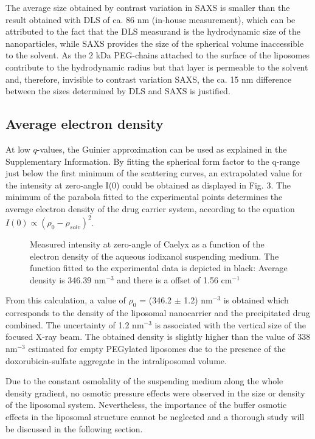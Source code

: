 The average size obtained by contrast variation in SAXS is smaller than the result obtained with DLS of ca. 86 nm (in-house measurement), which can be attributed to the fact that the DLS measurand is the hydrodynamic size of the nanoparticles, while SAXS provides the size of the spherical volume inaccessible to the solvent. As the 2 kDa PEG-chains attached to the surface of the liposomes contribute to the hydrodynamic radius but that layer is permeable to the solvent and, therefore, invisible to contrast variation SAXS, the ca. 15 nm difference between the sizes determined by DLS and SAXS is justified. 

\subsection{Average electron density}
At low $q$-values, the Guinier approximation can be used as explained in the Supplementary Information. By fitting the spherical form factor to the q-range just below the first minimum of the scattering curves, an extrapolated value for the intensity at zero-angle I(0) could be obtained as displayed in Fig. 3. The minimum of the parabola fitted to the experimental points determines the average electron density of the drug carrier system, according to the equation $I(0) \propto (\rho_0-\rho_{solv})^2$.

\begin{figure}
	\centering
		
		\caption{Measured intensity at zero-angle of Caelyx as a function of the electron density of the aqueous iodixanol suspending medium. The function fitted to the experimental data is depicted in black: Average density is 346.39 nm$^{-3}$ and there is a offset of 1.56 cm$^{-1}$}
		\label{fig:CaelyxAverageDensity}
\end{figure}

From this calculation, a value of $\rho_0$ = (346.2 $\pm$ 1.2) nm$^{-3}$ is obtained which corresponds to the density of the liposomal nanocarrier and the precipitated drug combined. The uncertainty of 1.2 nm$^{-3}$ is associated with the vertical size of the focused X-ray beam. The obtained density is slightly higher than the value of 338 nm$^{-3}$ estimated for empty PEGylated liposomes due to the presence of the doxorubicin-sulfate aggregate in the intraliposomal volume. 

Due to the constant osmolality of the suspending medium along the whole density gradient, no osmotic pressure effects were observed in the size or density of the liposomal system. Nevertheless, the importance of the buffer osmotic effects in the liposomal structure cannot be neglected and a thorough study will be discussed in the following section.

